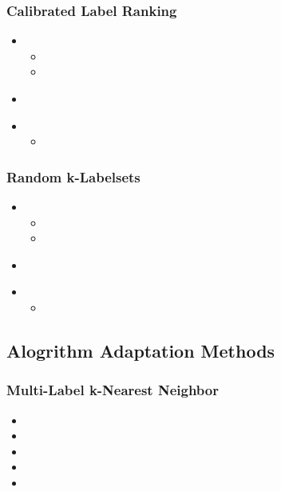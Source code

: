 \documentclass{beamer}
\begin{document}
\begin{frame}
\frametitle{Calibrated Label Ranking}
\begin{itemize}
\item <2-> 
\begin{itemize}
\item 
\item <4-> 
\end{itemize}
\end{itemize}
\begin{itemize}
\item<5-> 
\end{itemize}

\begin{itemize}
\item <7-> 
\begin{itemize}
\item <8-> 
\end{itemize}
\end{itemize}
\end{frame}
\begin{frame}
\frametitle{Random k-Labelsets}
\begin{itemize}
\item <2-> 
\begin{itemize}
\item 
\item <4-> 
\end{itemize}
\end{itemize}
\begin{itemize}
\item<5-> 
\end{itemize}

\begin{itemize}
\item <7-> 
\begin{itemize}
\item <8-> 
\end{itemize}
\end{itemize}
\end{frame}

\subsection{Alogrithm Adaptation Methods}

\begin{frame}
\frametitle{Multi-Label k-Nearest Neighbor}
\begin{itemize}
\item <2-> 
\item <3-> 
\item <4-> 
\item<5-> 
\item <6-> 
\end{itemize}
\end{frame}
\end{document}
